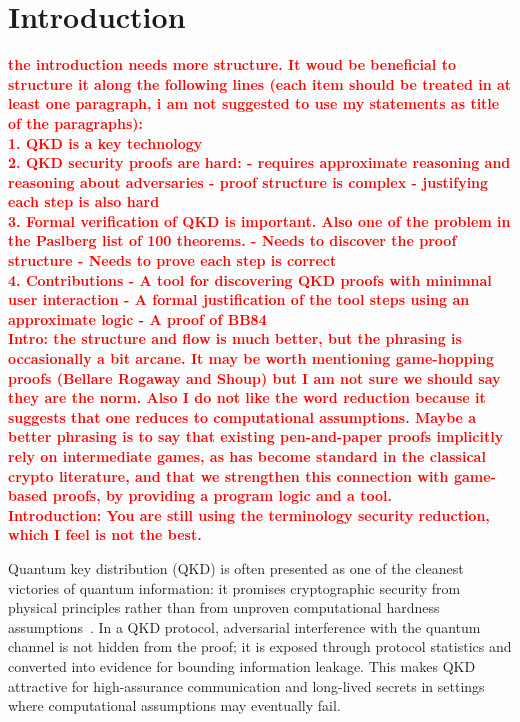 \documentclass[conference,compsoc]{IEEEtran}
\begin{document}
\section{Introduction}

\textbf{\textcolor{red}{ the introduction needs more structure. It woud be beneficial to structure it along the following lines (each item should be treated in at least one paragraph, i am not suggested to use my statements as title of the paragraphs):\\
1. QKD is a key technology\\
2. QKD security proofs are hard:
- requires approximate reasoning and reasoning about adversaries
- proof structure is complex
- justifying each step is also hard\\
3. Formal verification of QKD is important. Also one of the problem in the Paslberg list of 100 theorems. 
- Needs to discover the proof structure
- Needs to prove each step is correct\\
4. Contributions
- A tool for discovering QKD proofs with minimnal user interaction
- A formal justification of the tool steps using an approximate logic
- A proof of BB84\\
 Intro: the structure and flow is much better, but the phrasing is occasionally a bit arcane. It may be worth mentioning game-hopping proofs (Bellare Rogaway and Shoup) but I am not sure we should say they are the norm. Also I do not like the word reduction because it suggests that one reduces to computational assumptions. Maybe a better phrasing is to say that existing pen-and-paper proofs implicitly rely on intermediate games, as has become standard in the classical crypto literature, and that we strengthen this connection with game-based proofs, by providing a program logic and a tool.\\
  Introduction: You are still using the terminology security reduction, which I feel is not the best.}}

Quantum key distribution (QKD) is often presented as one of the cleanest victories of quantum information: it promises cryptographic security from physical principles rather than from unproven computational hardness assumptions~\cite{bb84,bbm92,scarani2009security,wehner2018quantum,xu2020secure,azuma2023quantum}. In a QKD protocol, adversarial interference with the quantum channel is not hidden from the proof; it is exposed through protocol statistics and converted into evidence for bounding information leakage. This makes QKD attractive for high-assurance communication and long-lived secrets in settings where computational assumptions may eventually fail.
\end{document}
